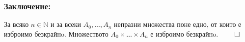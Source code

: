 \documentclass[a4paper, 12pt, oneside]{article}
\newcommand{\N}{\mathbb{N}}
\begin{document}
\subsubsection*{Заключение:}
За всяко \(n \in \N\) и за всеки \(A_0, \dots, A_n\) непразни множества
поне едно, от които е изброимо безкрайнo.
Множеството \(A_0 \times \dots \times A_n\) е изброимо безкрайнo. \(\qed\)
\end{document}
